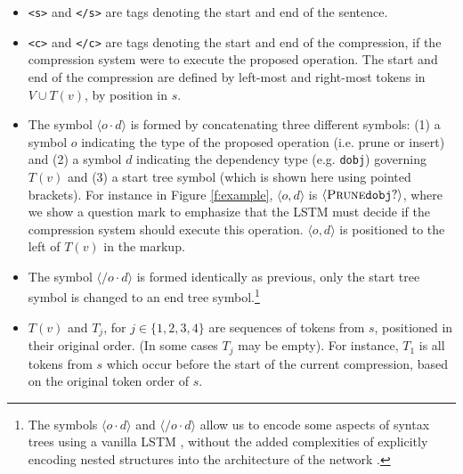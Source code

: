 \documentclass[11pt,a4paper]{article}
\begin{document}
\begin{itemize}
\item{\texttt{<s>} and \texttt{</s>} are tags denoting the start and end of the sentence.}
\item{ \texttt{<c>} and \texttt{</c>} are tags denoting the start and end of the compression, if the compression system were to execute the proposed operation. The start and end of the compression are defined by left-most and right-most tokens in $V \cup T(v)$, by position in $s$.}
\item{The symbol $\langle o \cdot d \rangle$ is formed by concatenating three different symbols: (1) a symbol $o$ indicating the type of the proposed operation (i.e. prune or insert) and (2) a symbol $d$ indicating the dependency type (e.g. \texttt{dobj}) governing $T(v)$ and (3) a start tree symbol (which is shown here using pointed brackets). For instance in Figure \ref{f:example}, $\langle o, d \rangle$ is $\langle \textsc{Prune} \texttt{dobj} ? \rangle$, where we show a question mark to emphasize that the LSTM must decide if the compression system should execute this operation. $\langle o, d \rangle$ is positioned to the left of $T(v)$ in the markup.} 
\item{The symbol $\langle / o \cdot d \rangle$ is formed identically as previous, only the start tree symbol is changed to an end tree symbol.\footnote{The symbols $\langle {o \cdot d} \rangle$ and $\langle / {o \cdot d} \rangle$  allow us to encode some aspects of syntax trees using a vanilla LSTM \cite{Vinyals2015GrammarAA,Aharoni2017TowardsSN}, without the added complexities of explicitly encoding nested structures into the architecture of the network \cite{Tai2015ImprovedSR,Dyer2016RecurrentNN}.} }
\item{$T(v)$ and $T_j$, for $j \in \{1,2,3,4\}$ are sequences of tokens from $s$, positioned in their original order. (In some cases $T_j$ may be empty). For instance, $T_1$ is all tokens from $s$ which occur before the start of the current compression, based on the original token order of $s$.} 
\end{itemize}
\end{document}
